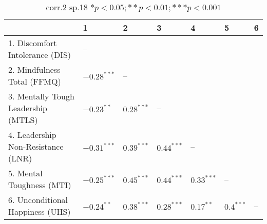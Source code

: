 \begin{table}[ht]
\centering
\begin{tabular}{lllllll}
  \hline
 & 1 & 2 & 3 & 4 & 5 & 6 \\ 
  \hline
1. Discomfort Intolerance (DIS) & -- &  &  &  &  &  \\ 
  2. Mindfulness Total (FFMQ) & $-0.28^{***}$ & -- &  &  &  &  \\ 
  3. Mentally Tough Leadership (MTLS) & $-0.23^{**}$ & $0.28^{***}$ & -- &  &  &  \\ 
  4. Leadership Non-Resistance (LNR) & $-0.31^{***}$ & $0.39^{***}$ & $0.44^{***}$ & -- &  &  \\ 
  5. Mental Toughness (MTI) & $-0.25^{***}$ & $0.45^{***}$ & $0.44^{***}$ & $0.33^{***}$ & -- &  \\ 
  6. Unconditional Happiness (UHS) & $-0.24^{**}$ & $0.38^{***}$ & $0.28^{***}$ & $0.17^{**}$ & $0.4^{***}$ & -- \\ 
   \hline
\end{tabular}
\caption{corr.2 sp.18 $* p < 0.05; ** p < 0.01; *** p < 0.001$} 
\label{freq_corr.corr.2.sp.18}
\end{table}
